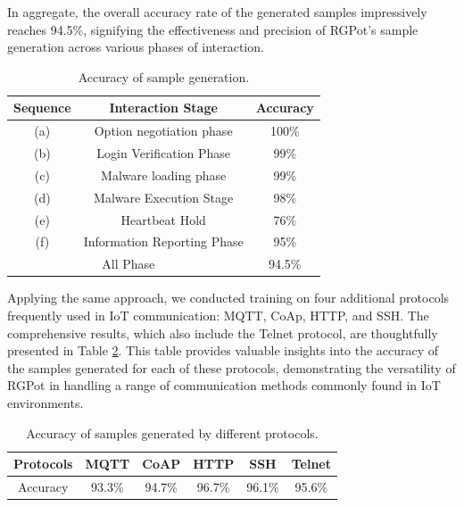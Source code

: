 \documentclass[journal]{IEEEtai}
\begin{document}
In aggregate, the overall accuracy rate of the generated samples impressively reaches 94.5\%, signifying the effectiveness and precision of RGPot's sample generation across various phases of interaction.


\begin{table}[!h]
\centering
\caption{Accuracy of sample generation.}
\label{table3}
\begin{tabular}{|cc|c|}
\hline
\multicolumn{1}{|c|}{Sequence} & Interaction Stage           & Accuracy \\ \hline
\multicolumn{1}{|c|}{(a)}      & Option negotiation phase    & 100\%    \\ \hline
\multicolumn{1}{|c|}{(b)}      & Login Verification Phase    & 99\%     \\ \hline
\multicolumn{1}{|c|}{(c)}      & Malware loading phase       & 99\%     \\ \hline
\multicolumn{1}{|c|}{(d)}      & Malware Execution Stage     & 98\%     \\ \hline
\multicolumn{1}{|c|}{(e)}      & Heartbeat Hold              & 76\%     \\ \hline
\multicolumn{1}{|c|}{(f)}      & Information Reporting Phase & 95\%     \\ \hline
\multicolumn{2}{|c|}{All Phase}                              & 94.5\%   \\ \hline
\end{tabular}
\end{table}



Applying the same approach, we conducted training on four additional protocols frequently used in IoT communication: MQTT, CoAp, HTTP, and SSH. The comprehensive results, which also include the Telnet protocol, are thoughtfully presented in Table \ref{table4}. 
This table provides valuable insights into the accuracy of the samples generated for each of these protocols, demonstrating the versatility of RGPot in handling a range of communication methods commonly found in IoT environments.

\begin{table}[!h]
\centering
\caption{Accuracy of samples generated by different protocols.}
\label{table4}
\begin{tabular}{|c|c|c|c|c|c|}
\hline
Protocols & MQTT   & CoAP   & HTTP   & SSH    & Telnet \\ \hline
Accuracy  & 93.3\% & 94.7\% & 96.7\% & 96.1\% & 95.6\% \\ \hline
\end{tabular}
\end{table}
\end{document}

